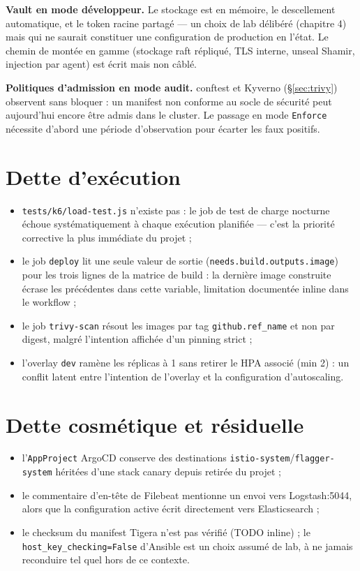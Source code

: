 \documentclass[12pt,a4paper,twoside,openright]{report}
\begin{document}
\textbf{Vault en mode développeur.} Le stockage est en mémoire, le descellement
automatique, et le token racine partagé — un choix de lab délibéré (chapitre 4)
mais qui ne saurait constituer une configuration de production en l'état. Le
chemin de montée en gamme (stockage raft répliqué, TLS interne, unseal Shamir,
injection par agent) est écrit mais non câblé.

\textbf{Politiques d'admission en mode audit.} conftest et Kyverno
(\S\ref{sec:trivy}) observent sans bloquer : un manifest non conforme au socle de
sécurité peut aujourd'hui encore être admis dans le cluster. Le passage en mode
\texttt{Enforce} nécessite d'abord une période d'observation pour écarter les
faux positifs.

\section{Dette d'exécution}

\begin{itemize}[itemsep=2pt]
  \item \texttt{tests/k6/load-test.js} n'existe pas : le job de test de charge
        nocturne échoue systématiquement à chaque exécution planifiée — c'est la
        priorité corrective la plus immédiate du projet ;
  \item le job \texttt{deploy} lit une seule valeur de sortie
        (\texttt{needs.build.outputs.image}) pour les trois lignes de la matrice de
        build : la dernière image construite écrase les précédentes dans cette
        variable, limitation documentée inline dans le workflow ;
  \item le job \texttt{trivy-scan} résout les images par tag
        \texttt{github.ref\_name} et non par digest, malgré l'intention affichée
        d'un pinning strict ;
  \item l'overlay \texttt{dev} ramène les réplicas à 1 sans retirer le HPA associé
        (min 2) : un conflit latent entre l'intention de l'overlay et la
        configuration d'autoscaling.
\end{itemize}

\section{Dette cosmétique et résiduelle}

\begin{itemize}[itemsep=2pt]
  \item l'\texttt{AppProject} ArgoCD conserve des destinations
        \texttt{istio-system}/\texttt{flagger-system} héritées d'une stack canary
        depuis retirée du projet ;
  \item le commentaire d'en-tête de Filebeat mentionne un envoi vers Logstash:5044,
        alors que la configuration active écrit directement vers Elasticsearch ;
  \item le checksum du manifest Tigera n'est pas vérifié (TODO inline) ; le
        \texttt{host\_key\_checking=False} d'Ansible est un choix assumé de lab, à
        ne jamais reconduire tel quel hors de ce contexte.
\end{itemize}
\end{document}
